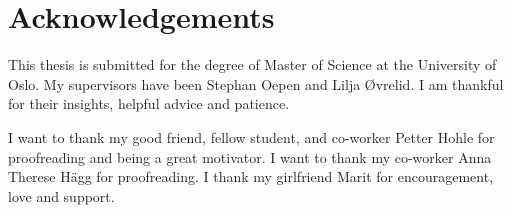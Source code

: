 \chapter*{Acknowledgements}
\thispagestyle{empty}

This thesis is submitted for the degree of Master of Science at the University of Oslo. My supervisors have been Stephan Oepen and Lilja Øvrelid. I am thankful for their insights, helpful advice and patience.

I want to thank my good friend, fellow student, and co-worker Petter Hohle for proofreading and being a great motivator. I want to thank my co-worker Anna Therese Hägg for proofreading. I thank my girlfriend Marit for encouragement, love and support.